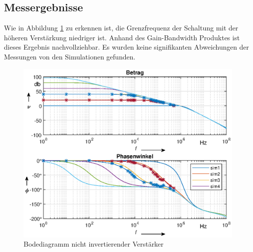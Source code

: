 \subsection{Messergebnisse}
Wie in Abbildung \ref{fig:bode_niinv} zu erkennen ist, die Grenzfrequenz der Schaltung mit der höheren Verstärkung niedriger ist. Anhand des Gain-Bandwidth Produktes ist dieses Ergebnis nachvollziehbar. Es wurden keine signifikanten Abweichungen der Messungen von den Simulationen gefunden. 
\begin{figure}[H]
    \centering
    \includegraphics[width=\costumPicWidth]{Lab_1/Plots/niinv_verst.eps}
    \caption{Bodediagramm nicht invertierender Verstärker}
    \label{fig:bode_niinv}
\end{figure}

